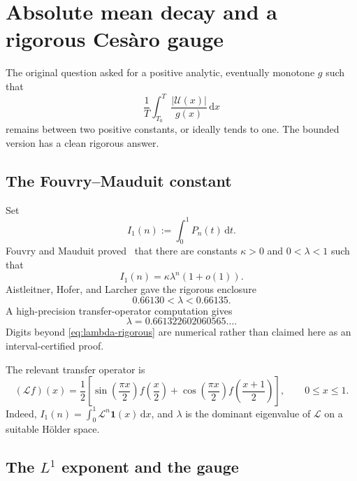 \documentclass[11pt,oneside]{article}
\theoremstyle{definition}
\theoremstyle{remark}
\newcommand{\dd}{\,\mathrm d}
\newcommand{\Uhat}{\mathcal U}
\newcommand{\Lop}{\mathcal L}
\begin{document}
\section{Absolute mean decay and a rigorous Ces\`aro gauge}\label{sec:cesaro}

The original question asked for a positive analytic, eventually monotone $g$ such that
\[
 \frac1T\int_{T_0}^{T}\frac{|\Uhat(x)|}{g(x)}\dd x
\]
remains between two positive constants, or ideally tends to one.  The bounded version
has a clean rigorous answer.

\subsection{The Fouvry--Mauduit constant}

Set
\begin{equation}\label{eq:I1n}
 I_1(n):=\int_0^1P_n(t)\dd t.
\end{equation}
Fouvry and Mauduit proved~\cite{fouvrymauduit1996} that there are constants
$\kappa>0$ and $0<\lambda<1$ such that
\begin{equation}\label{eq:FM}
 I_1(n)=\kappa\lambda^n(1+o(1)).
\end{equation}
Aistleitner, Hofer, and Larcher gave the rigorous enclosure
\begin{equation}\label{eq:lambda-rigorous}
 0.66130<\lambda<0.66135.
\end{equation}
A high-precision transfer-operator computation gives
\begin{equation}\label{eq:lambda-numeric}
 \lambda=0.661322602060565\ldots .
\end{equation}
Digits beyond \eqref{eq:lambda-rigorous} are numerical rather than claimed here as an
interval-certified proof.

The relevant transfer operator is
\begin{equation}\label{eq:transfer-L1}
 (\Lop f)(x)=\frac12\left[
 \sin\!\left(\frac{\pi x}{2}\right)f\!\left(\frac x2\right)
 +\cos\!\left(\frac{\pi x}{2}\right)f\!\left(\frac{x+1}{2}\right)
 \right],\qquad 0\le x\le1.
\end{equation}
Indeed, $I_1(n)=\int_0^1\Lop^n\mathbf1(x)\dd x$, and $\lambda$ is the dominant
eigenvalue of $\Lop$ on a suitable H\"older space.

\subsection{The \texorpdfstring{$L^1$}{L1} exponent and the gauge}
\end{document}
